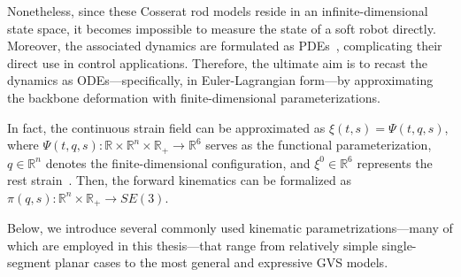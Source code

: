 Nonetheless, since these Cosserat rod models reside in an infinite-dimensional state space, it becomes impossible to measure the state of a soft robot directly. Moreover, the associated dynamics are formulated as \glspl{PDE}~\citep{gazzola2018forward}, complicating their direct use in control applications. Therefore, the ultimate aim is to recast the dynamics as \glspl{ODE}—specifically, in Euler-Lagrangian form—by approximating the backbone deformation with finite-dimensional parameterizations.

In fact, the continuous strain field can be approximated as $\xi(t,s) = \Psi(t,q,s)$,
where $\Psi(t,q,s): \mathbb{R} \times \mathbb{R}^n \times \mathbb{R}_+ \to \mathbb{R}^6$ serves as the functional parameterization, $q \in \mathbb{R}^n$ denotes the finite-dimensional configuration, and $\xi^0 \in \mathbb{R}^6$ represents the rest strain~\citep{mathew2025reduced}. Then, the forward kinematics can be formalized as
$\pi(q,s): \mathbb{R}^n \times \mathbb{R}_+ \to SE(3)$.

Below, we introduce several commonly used kinematic parametrizations—many of which are employed in this thesis—that range from relatively simple single-segment planar cases to the most general and expressive \gls{GVS} models.

